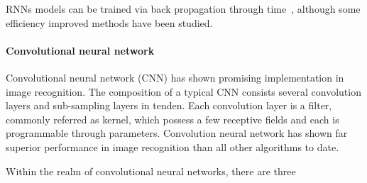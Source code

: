 RNNs models can be trained via back propagation through time~\cite{Goodfellow-et-al-2016}, although some efficiency improved methods have been studied.~\cite{963769,neco.1989,Gomez:2008:ANE:1390681.1390712}

\paragraph{Convolutional neural network}
Convolutional neural network (CNN) has shown promising implementation in image recognition. The composition of a typical CNN consists several convolution layers and sub-sampling layers in tenden. Each convolution layer is a filter, commonly referred as kernel, which possess a few receptive fields and each is programmable through parameters.  
Convolution neural network has shown far superior performance in image recognition than all other algorithms to date.~\cite{Szegedy_2015}
\par 
Within the realm of convolutional neural networks, there are three